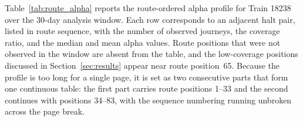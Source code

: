 \documentclass[a4paper,fleqn]{cas-dc}
\begin{document}
Table~\ref{tab:route_alpha} reports the route-ordered alpha profile for Train
18238 over the 30-day analysis window. Each row corresponds to an adjacent
halt pair, listed in route sequence, with the number of observed journeys, the
coverage ratio, and the median and mean alpha values. Route positions that were
not observed in the window are absent from the table, and the low-coverage
positions discussed in Section~\ref{sec:results} appear near route
position~65. Because the profile is too long for a single page, it is set as
two consecutive parts that form one continuous table: the first part carries
route positions 1--33 and the second continues with positions 34--83, with the
sequence numbering running unbroken across the page break.

\makeatletter
\def\@dbflt#1{\@ifnextchar[{\@xdblfloat{#1}}{\@xdblfloat{#1}[b]}}
\makeatother
\end{document}
